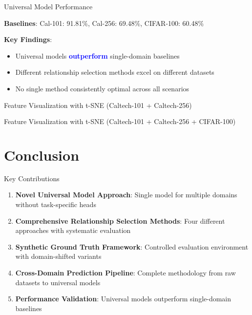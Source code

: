 \documentclass[aspectratio=169]{beamer}
\begin{document}
\begin{frame}{Universal Model Performance}
    \vspace{0.5em}

    \textbf{Baselines}: Cal-101: 91.81\%, Cal-256: 69.48\%, CIFAR-100: 60.48\%

    \textbf{Key Findings}:
    \begin{itemize}
        \item Universal models \textcolor{blue}{\textbf{outperform}} single-domain baselines
        \item Different relationship selection methods excel on different datasets
        \item No single method consistently optimal across all scenarios
    \end{itemize}
\end{frame}

\begin{frame}{Feature Visualization with t-SNE (Caltech-101 + Caltech-256)}
    \begin{center}
        \resizebox{0.65\textwidth}{!}{}
    \end{center}
\end{frame}

\begin{frame}{Feature Visualization with t-SNE (Caltech-101 + Caltech-256 + CIFAR-100)}
    \begin{center}
        \resizebox{0.65\textwidth}{!}{}
    \end{center}
\end{frame}

\section{Conclusion}

\begin{frame}{Key Contributions}
    \begin{enumerate}
        \item \textbf{Novel Universal Model Approach}: Single model for multiple domains without task-specific heads

        \item \textbf{Comprehensive Relationship Selection Methods}: Four different approaches with systematic evaluation

        \item \textbf{Synthetic Ground Truth Framework}: Controlled evaluation environment with domain-shifted variants

        \item \textbf{Cross-Domain Prediction Pipeline}: Complete methodology from raw datasets to universal models

        \item \textbf{Performance Validation}: Universal models outperform single-domain baselines
    \end{enumerate}
\end{frame}
\end{document}
